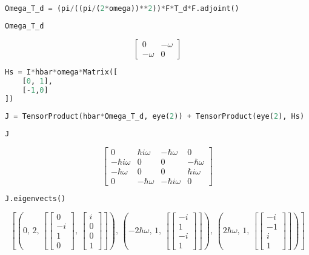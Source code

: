 \begin{lstlisting}[language=Python]
Omega_T_d = (pi/((pi/(2*omega))**2))*F*T_d*F.adjoint()
\end{lstlisting}

\begin{lstlisting}[language=Python]
Omega_T_d
\end{lstlisting}

\[\left[\begin{matrix}0 & - \omega\\- \omega & 0\end{matrix}\right]\]

\begin{lstlisting}[language=Python]
Hs = I*hbar*omega*Matrix([
    [0, 1],
    [-1,0]
])
\end{lstlisting}

\begin{lstlisting}[language=Python]
J = TensorProduct(hbar*Omega_T_d, eye(2)) + TensorProduct(eye(2), Hs)
\end{lstlisting}

\begin{lstlisting}[language=Python]
J
\end{lstlisting}

\[\left[\begin{matrix}0 & \hbar i \omega & - \hbar \omega & 0\\- \hbar i \omega & 0 & 0 & - \hbar \omega\\- \hbar \omega & 0 & 0 & \hbar i \omega\\0 & - \hbar \omega & - \hbar i \omega & 0\end{matrix}\right]\]

\begin{lstlisting}[language=Python]
J.eigenvects()
\end{lstlisting}

\[\left [ \left ( 0, \, 2, \, \left [ \left[\begin{matrix}0\\- i\\1\\0\end{matrix}\right], \, \left[\begin{matrix}i\\0\\0\\1\end{matrix}\right]\right ]\right ), \, \left ( - 2 \hbar \omega, \, 1, \, \left [ \left[\begin{matrix}- i\\1\\- i\\1\end{matrix}\right]\right ]\right ), \, \left ( 2 \hbar \omega, \, 1, \, \left [ \left[\begin{matrix}- i\\-1\\i\\1\end{matrix}\right]\right ]\right )\right ]\]

